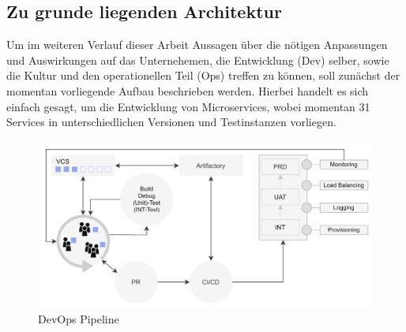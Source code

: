 \documentclass[11pt]{article}
\begin{document}
\subsection{Zu grunde liegenden Architektur}
Um im weiteren Verlauf dieser Arbeit Aussagen über die nötigen Anpassungen und Auswirkungen auf das Unternehemen, die Entwicklung (Dev) selber, sowie die Kultur und den operationellen Teil (Ops) treffen zu können, soll zunächst der momentan vorliegende Aufbau beschrieben werden. Hierbei handelt es sich einfach gesagt, um die Entwicklung von Microservices, wobei momentan 31 Services in unterschiedlichen Versionen und Testinstanzen vorliegen. 
\begin{figure}[H]
\caption{DevOps Pipeline}
\label{fig:devops}
\centering
\includegraphics[width=1\textwidth]{DevOps}
\end{figure}
\end{document}
